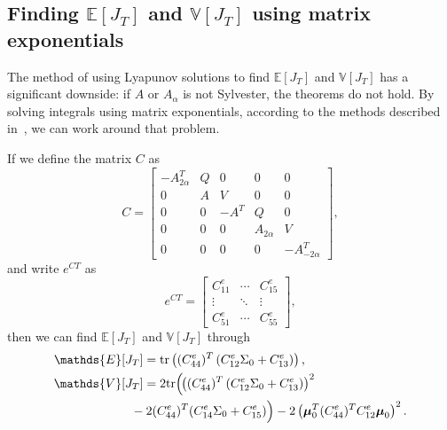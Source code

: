 \documentclass[twocolumn]{autart}
\newcommand{\ve}[1]{{\boldsymbol{#1}}} \newcommand{\tr}{\mbox{tr}} \newcommand{\ex}{\mathds{E}} \newcommand{\va}{\mathds{V}}
\begin{document}
\subsection{Finding $\ex[J_T]$ and $\va[J_T]$ using matrix exponentials}

The method of using Lyapunov solutions to find $\ex[J_T]$ and $\va[J_T]$ has a significant downside: if $A$ or $A_\alpha$ is not Sylvester, the theorems do not hold. By solving integrals using matrix exponentials, according to the methods described in~\cite{MatrixExponentials}, we can work around that problem.

\begin{thm}\label{th:MatrixExponentialsForCostMeanAndVariance}
If we define the matrix $C$ as
\begin{equation}
C = \begin{bmatrix}
-A_{2\alpha}^T & Q & 0 & 0 & 0 \\
0 & A & V & 0 & 0 \\
0 & 0 & -A^T & Q & 0 \\
0 & 0 & 0 & A_{2\alpha} & V \\
0 & 0 & 0 & 0 & -A_{-2\alpha}^T
\end{bmatrix},
\end{equation}
and write $e^{CT}$ as
\begin{equation}
e^{CT} = \begin{bmatrix}
C_{11}^e & \cdots & C_{15}^e \\
\vdots & \ddots & \vdots \\
C_{51}^e & \cdots & C_{55}^e
\end{bmatrix},
\end{equation}
then we can find $\ex[J_T]$ and $\va[J_T]$ through
\begin{align}
\ex[J_T] & = \tr\left((C_{44}^e)^T \left(C_{12}^e \Sigma_0 + C_{13}^e\right)\right), \label{eq:FiniteTimeMatrixExponentialCostMean} \\
\va[J_T] & = 2\tr\Big(\hspace{-3pt}\left((C_{44}^e)^T \left(C_{12}^e \Sigma_0 + C_{13}^e\right)\right)^2 \label{eq:FiniteTimeMatrixExponentialCostVariance} \\
& \hspace{-10pt} - 2(C_{44}^e)^T (C_{14}^e \Sigma_0 + C_{15}^e)\Big) - 2\left(\ve{\mu}_0^T (C_{44}^e)^T C_{12}^e \ve{\mu}_0\right)^2. \nonumber
\end{align}
\end{thm}
\end{document}
